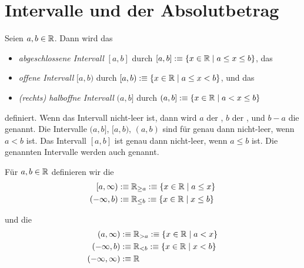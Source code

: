 \section{Intervalle und der Absolutbetrag}

\begin{mydef}[Intervalle]
  Seien $a,b \in \mathbb{R}$. Dann wird das
  \begin{itemize}
    \item \emph{abgeschlossene Intervall} $[a,b]$ durch
    $[a,b] :\equiv \{ x \in \mathbb{R} \mid a \leq x \leq b \}$, das
    \item \emph{offene Intervall} $[a,b)$ durch
    $[a,b) :\equiv \{x \in \mathbb{R} \mid a \leq x < b \}$, und das
    \item \emph{(rechts) halboffne Intervall} $(a,b]$ durch
    $(a,b] :\equiv \{ x \in \mathbb{R} \mid a < x \leq b \}$
  \end{itemize}
  definiert. Wenn das Intervall nicht-leer ist, dann wird $a$ der , $b$ der , und $b-a$ die  genannt. Die Intervalle $(a,b]$, $[a,b)$, $(a,b)$ sind für genau dann nicht-leer, wenn $a<b$ ist. Das Intervall $[a,b]$ ist genau dann nicht-leer, wenn $a\leq b$ ist. Die genannten Intervalle werden auch  genannt.
\end{mydef}

\begin{mydef}
  Für $a,b \in \mathbb{R}$ definieren wir die 
  \[
    \begin{aligned}
      [a, \infty) &:\equiv \real_{\geq a} :\equiv \{x \in \real \mid a \leq x \} \\
      (-\infty, b) &:\equiv \real_{\leq b} :\equiv \{ x \in \real \mid x \leq b \}
    \end{aligned}
  \]

  und die 
  \[
    \begin{aligned}
      (a, \infty) &:\equiv \mathbb{R}_{>a} :\equiv \{ x \in \mathbb{R} \mid a < x \} \\
      (-\infty, b) &:\equiv \mathbb{R}_{<b} :\equiv \{ x \in \mathbb{R} \mid x < b \} \\
      (-\infty, \infty) &:\equiv \mathbb{R}
    \end{aligned}
  \]
\end{mydef}

